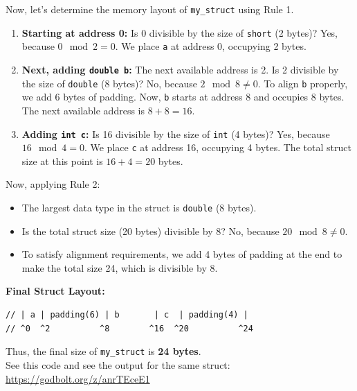 \documentclass{article}
\begin{document}
Now, let's determine the memory layout of \texttt{my\_struct} using Rule 1.

\begin{enumerate}
    \item \textbf{Starting at address 0:}  
    Is 0 divisible by the size of \texttt{short} (2 bytes)?  
    Yes, because \( 0 \mod 2 = 0 \).  
    We place \texttt{a} at address 0, occupying 2 bytes.

    \item \textbf{Next, adding \texttt{double b}:}  
    The next available address is 2.  
    Is 2 divisible by the size of \texttt{double} (8 bytes)?  
    No, because \( 2 \mod 8 \neq 0 \).  
    To align \texttt{b} properly, we add 6 bytes of padding.  
    Now, \texttt{b} starts at address 8 and occupies 8 bytes.  
    The next available address is \( 8 + 8 = 16 \).

    \item \textbf{Adding \texttt{int c}:}  
    Is 16 divisible by the size of \texttt{int} (4 bytes)?  
    Yes, because \( 16 \mod 4 = 0 \).  
    We place \texttt{c} at address 16, occupying 4 bytes.  
    The total struct size at this point is \( 16 + 4 = 20 \) bytes.

\end{enumerate}

Now, applying Rule 2:

\begin{itemize}
    \item The largest data type in the struct is \texttt{double} (8 bytes).
    \item Is the total struct size (20 bytes) divisible by 8?  
    No, because \( 20 \mod 8 \neq 0 \).
    \item To satisfy alignment requirements, we add 4 bytes of padding at the end to make the total size 24, which is divisible by 8.
\end{itemize}

\textbf{Final Struct Layout:}

\begin{verbatim}
// | a | padding(6) | b       | c  | padding(4) |
// ^0  ^2          ^8        ^16  ^20          ^24
\end{verbatim}

Thus, the final size of \texttt{my\_struct} is \textbf{24 bytes}. \\
See this code and see the output for the same struct: \\

\url{https://godbolt.org/z/anrTEceE1}\\
\end{document}
